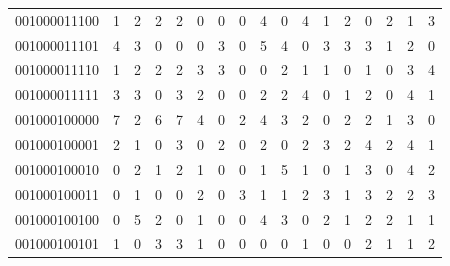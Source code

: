 \documentclass[10pt,a4paper]{article}
\begin{document}
\begin{longtable}{ |c|c|c|c|c|c|c|c|c|c|c|c|c|c|c|c|c| }
    001000011100              & 1                            & 2                                & 2                            & 2                              & 0   & 0   & 0   & 4   & 0   & 4   & 1   & 2   & 0   & 2   & 1   & 3   \\
    001000011101              & 4                            & 3                                & 0                            & 0                              & 0   & 3   & 0   & 5   & 4   & 0   & 3   & 3   & 3   & 1   & 2   & 0   \\
    001000011110              & 1                            & 2                                & 2                            & 2                              & 3   & 3   & 0   & 0   & 2   & 1   & 1   & 0   & 1   & 0   & 3   & 4   \\
    001000011111              & 3                            & 3                                & 0                            & 3                              & 2   & 0   & 0   & 2   & 2   & 4   & 0   & 1   & 2   & 0   & 4   & 1   \\
    001000100000              & 7                            & 2                                & 6                            & 7                              & 4   & 0   & 2   & 4   & 3   & 2   & 0   & 2   & 2   & 1   & 3   & 0   \\
    001000100001              & 2                            & 1                                & 0                            & 3                              & 0   & 2   & 0   & 2   & 0   & 2   & 3   & 2   & 4   & 2   & 4   & 1   \\
    001000100010              & 0                            & 2                                & 1                            & 2                              & 1   & 0   & 0   & 1   & 5   & 1   & 0   & 1   & 3   & 0   & 4   & 2   \\
    001000100011              & 0                            & 1                                & 0                            & 0                              & 2   & 0   & 3   & 1   & 1   & 2   & 3   & 1   & 3   & 2   & 2   & 3   \\
    001000100100              & 0                            & 5                                & 2                            & 0                              & 1   & 0   & 0   & 4   & 3   & 0   & 2   & 1   & 2   & 2   & 1   & 1   \\
    001000100101              & 1                            & 0                                & 3                            & 3                              & 1   & 0   & 0   & 0   & 0   & 1   & 0   & 0   & 2   & 1   & 1   & 2   \\

\end{longtable}
\end{document}
